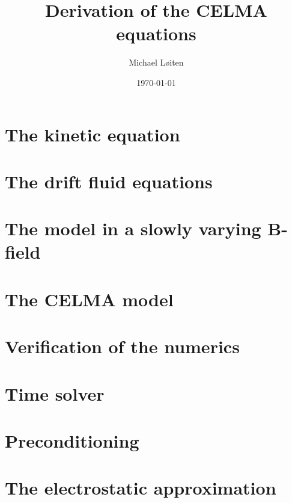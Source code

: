 \documentclass[12pt,a4paper,oneside,openright]{report} %
\title{\vspace{-8ex}Derivation of the CELMA equations\vspace{-1ex}}
\author{Michael L{\o}iten}
\date{\vspace{-2ex}\today}
\begin{document}
\maketitle

\chapter{The kinetic equation}

%
\chapter{The drift fluid equations}
\label{chap:drift-order}


\chapter{The model in a slowly varying B-field}


\chapter{The CELMA model}






%
%
\chapter{Verification of the numerics}
\label{app:verification}


\appendix

\chapter{Time solver}
\label{app:timeSolver}


\chapter{Preconditioning}
\label{app:precon}


\chapter{The electrostatic approximation}
\label{app:elstat}

\end{document}
